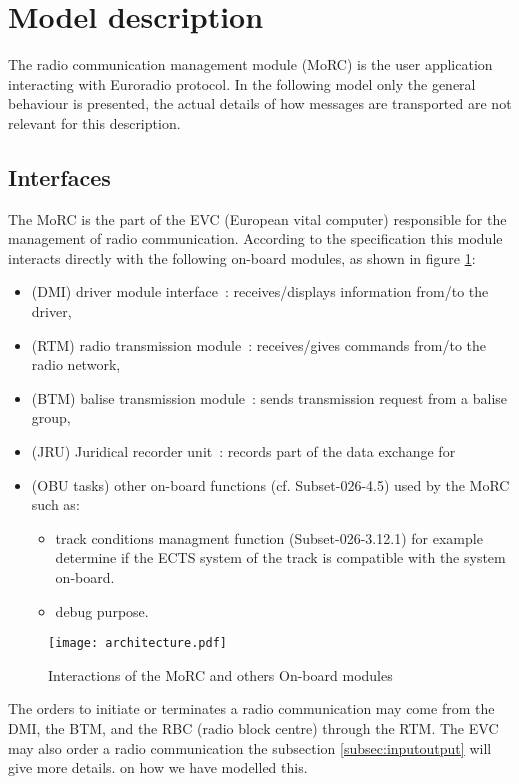 \section{Model description}
\label{sec:modeldescription}
The radio communication management module (MoRC) is the user application interacting
with Euroradio protocol. In the following model only the general behaviour is
presented, the actual details of how messages are transported are not relevant
for this description.
\subsection{Interfaces}
\label{subsec:interfaces}


The MoRC is the part of the EVC (European vital computer) responsible for the
management of radio communication.
According to the specification this module interacts directly with the following
on-board modules, as shown in figure \ref{fig:arch}: 
\begin{itemize}
\item (DMI) driver module interface~: receives/displays information from/to the driver,
\item (RTM) radio transmission module~: receives/gives commands from/to the radio
network,
\item (BTM) balise transmission module~: sends transmission request from a balise group,
\item (JRU) Juridical recorder unit~: records part of the data exchange for
\item (OBU tasks) other on-board functions (cf. Subset-026-4.5) used  by the MoRC such as:
\begin{itemize}
\item track conditions managment function  (Subset-026-3.12.1)
for example determine if the ECTS system of the track is compatible with the
system on-board.
\item debug purpose.
\end{itemize}
\end{itemize}

\begin{figure}
\centering
\texttt{[image: architecture.pdf]}
\caption{\label{fig:arch}Interactions of the MoRC and others On-board modules}
\end{figure}

The orders to initiate or terminates a radio communication may come from the
DMI, the BTM, and the RBC (radio block centre) through the RTM. The EVC may also order a radio
communication the subsection \ref{subsec:inputoutput} will give more details.
 on how we have modelled this.
